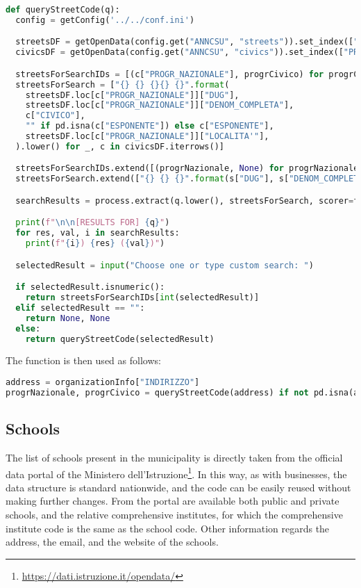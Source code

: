\begin{lstlisting}[language=python,caption={The function that retrieve the street identifiers from the string of the address.},label=code:organizations-anncsu-py]
def queryStreetCode(q):
  config = getConfig('../../conf.ini')

  streetsDF = getOpenData(config.get("ANNCSU", "streets")).set_index(["PROGR_NAZIONALE"])
  civicsDF = getOpenData(config.get("ANNCSU", "civics")).set_index(["PROGR_CIVICO"])

  streetsForSearchIDs = [(c["PROGR_NAZIONALE"], progrCivico) for progrCivico, c in civicsDF.iterrows()]
  streetsForSearch = ["{} {} {}{} {}".format(
    streetsDF.loc[c["PROGR_NAZIONALE"]]["DUG"],
    streetsDF.loc[c["PROGR_NAZIONALE"]]["DENOM_COMPLETA"],
    c["CIVICO"],
    "" if pd.isna(c["ESPONENTE"]) else c["ESPONENTE"],
    streetsDF.loc[c["PROGR_NAZIONALE"]]["LOCALITA'"],
  ).lower() for _, c in civicsDF.iterrows()]

  streetsForSearchIDs.extend([(progrNazionale, None) for progrNazionale, _ in streetsDF.iterrows()])
  streetsForSearch.extend(["{} {} {}".format(s["DUG"], s["DENOM_COMPLETA"], s["LOCALITA'"]).lower() for _, s in streetsDF.iterrows()])

  searchResults = process.extract(q.lower(), streetsForSearch, scorer=fuzz.WRatio, limit=10)

  print(f"\n\n[RESULTS FOR] {q}")
  for res, val, i in searchResults:
    print(f"{i}) {res} ({val})")

  selectedResult = input("Choose one or type custom search: ")

  if selectedResult.isnumeric():
    return streetsForSearchIDs[int(selectedResult)]
  elif selectedResult == "":
    return None, None
  else:
    return queryStreetCode(selectedResult)
\end{lstlisting}

The function is then used as follows:

\begin{lstlisting}[language=python]
address = organizationInfo["INDIRIZZO"]
progrNazionale, progrCivico = queryStreetCode(address) if not pd.isna(address) else (None, None)
\end{lstlisting}

\subsection{Schools}
\label{subsec:schools-data}

The list of schools present in the municipality is directly taken from the official data portal of the Ministero dell'Istruzione\footnote{\url{https://dati.istruzione.it/opendata/}}. In this way, as with businesses, the data structure is standard nationwide, and the code can be easily reused without making further changes. From the portal are available both public and private schools, and the relative comprehensive institutes, for which the comprehensive institute code is the same as the school code. Other information regards the address, the email, and the website of the schools.


